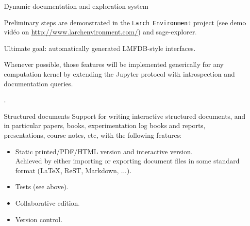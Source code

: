 \begin{Workpackage}{\thewpno}
\begin{task}{Dynamic documentation and exploration system}
\begin{itemize}
    Preliminary steps are demonstrated in the \texttt{Larch
      Environment} project (see demo vidéo on
    \url{http://www.larchenvironment.com/}) and sage-explorer.

    Ultimate goal: automatically generated LMFDB-style interfaces.
  \end{itemize}




  Whenever possible, those features will be implemented generically
  for any computation kernel by extending the Jupyter protocol with
  introspection and documentation queries.


  \item .
  \item     %

\end{task}

\begin{task}{Structured documents}
  Support for writing interactive structured documents, and in
  particular papers, books, experimentation log books and reports,
  presentations, course notes, etc, with the following features:
  \begin{itemize}
  \item Static printed/PDF/HTML version and interactive version.\\
    Achieved by either importing or exporting document files in some
    standard format (LaTeX, ReST, Markdown, ...).
  \item Tests (see above).
  \item Collaborative edition.
  \item Version control.
  \end{itemize}
\end{task}




\begin{WPDeliverables}


\end{WPDeliverables}
\end{Workpackage}
